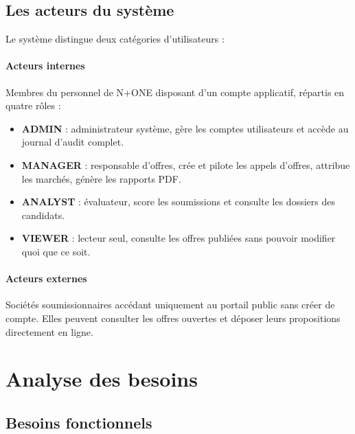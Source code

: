 \subsection{Les acteurs du système}

Le système distingue deux catégories d'utilisateurs :

\paragraph{Acteurs internes} Membres du personnel de N+ONE disposant d'un compte applicatif, répartis en quatre rôles :

\begin{itemize}
    \item \textbf{ADMIN} : administrateur système, gère les comptes utilisateurs et accède au journal d'audit complet.
    \item \textbf{MANAGER} : responsable d'offres, crée et pilote les appels d'offres, attribue les marchés, génère les rapports PDF.
    \item \textbf{ANALYST} : évaluateur, score les soumissions et consulte les dossiers des candidats.
    \item \textbf{VIEWER} : lecteur seul, consulte les offres publiées sans pouvoir modifier quoi que ce soit.
\end{itemize}

\paragraph{Acteurs externes} Sociétés soumissionnaires accédant uniquement au portail public sans créer de compte. Elles peuvent consulter les offres ouvertes et déposer leurs propositions directement en ligne.

\section{Analyse des besoins}

\subsection{Besoins fonctionnels}

